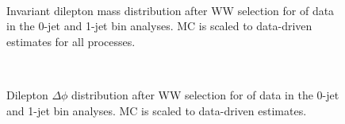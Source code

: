 \begin{figure}[!hbtp]
\centering
\subfigure[]{
\centering
\label{subfig:ww_dilmass_0j}
}
\subfigure[]{
\centering
\label{subfig:ww_dilmass_1j}
} \\
\caption{Invariant dilepton mass distribution after WW selection for \intlumiEightTeV of data 
in the 0-jet  and 1-jet  bin analyses. 
MC is scaled to data-driven estimates for all processes.}
\label{fig:ww_dilmass}
\end{figure}

\begin{figure}[!hbtp]
\centering
\subfigure[]{
\centering
\label{subfig:ww_deltaphi_0j}
}
\subfigure[]{
\centering
\label{subfig:ww_deltaphi_1j}
} \\
\caption{Dilepton $\Delta\phi$ distribution after WW selection for \intlumiEightTeV of data 
in the 0-jet  and 1-jet  bin analyses. 
MC is scaled to data-driven estimates.}
\label{fig:ww_deltaphi}
\end{figure}

